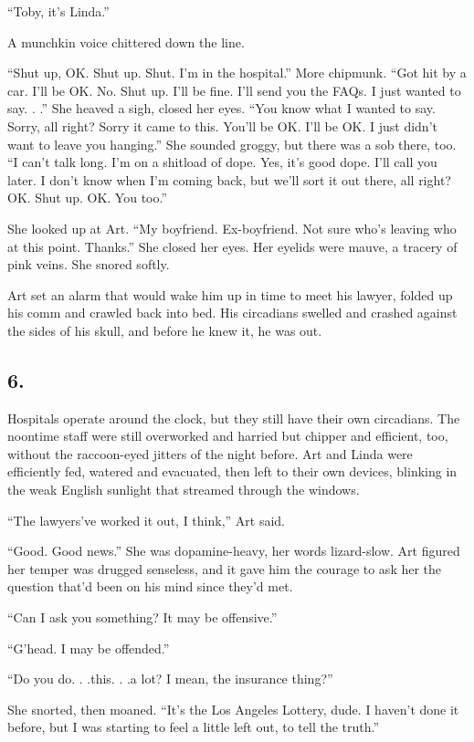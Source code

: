 “Toby, it’s Linda.”

A munchkin voice chittered down the line.

“Shut up, OK. Shut up. Shut. I’m in the hospital.” More chipmunk.
“Got hit by a car. I’ll be OK. No. Shut up. I’ll be fine. I’ll send
you the FAQs. I just wanted to say. . .” She heaved a sigh, closed
her eyes. “You know what I wanted to say. Sorry, all right? Sorry
it came to this. You’ll be OK. I’ll be OK. I just didn’t want to
leave you hanging.” She sounded groggy, but there was a sob there,
too. “I can’t talk long. I’m on a shitload of dope. Yes, it’s good
dope. I’ll call you later. I don’t know when I’m coming back, but
we’ll sort it out there, all right? OK. Shut up. OK. You too.”

She looked up at Art. “My boyfriend. Ex-boyfriend. Not sure who’s
leaving who at this point. Thanks.” She closed her eyes. Her
eyelids were mauve, a tracery of pink veins. She snored softly.

Art set an alarm that would wake him up in time to meet his lawyer,
folded up his comm and crawled back into bed. His circadians
swelled and crashed against the sides of his skull, and before he
knew it, he was out.

\subsection{6.}

Hospitals operate around the clock, but they still have their own
circadians. The noontime staff were still overworked and harried
but chipper and efficient, too, without the raccoon-eyed jitters of
the night before. Art and Linda were efficiently fed, watered and
evacuated, then left to their own devices, blinking in the weak
English sunlight that streamed through the windows.

“The lawyers’ve worked it out, I think,” Art said.

“Good. Good news.” She was dopamine-heavy, her words liz\-ard-slow.
Art figured her temper was drugged senseless, and it gave him the
courage to ask her the question that’d been on his mind since
they’d met.

“Can I ask you something? It may be offensive.”

“G’head. I may be offended.”

“Do you do. . .this. . .a lot? I mean, the insurance thing?”

She snorted, then moaned. “It’s the Los Angeles Lottery, dude. I
haven’t done it before, but I was starting to feel a little left
out, to tell the truth.”

